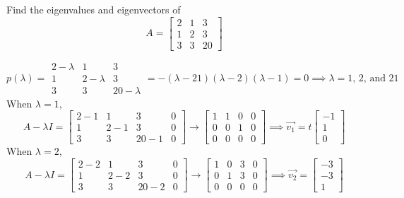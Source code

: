 \begin{example}
	Find the eigenvalues and eigenvectors of
	\begin{equation*}
		A = \begin{bmatrix}
			2 & 1 & 3 \\
			1 & 2 & 3 \\
			3 & 3 & 20
		\end{bmatrix}
	\end{equation*}
\end{example}
\begin{equation*}
	p(\lambda) = \begin{array}{|ccc|}
	2-\lambda & 1 & 3 \\
	1 & 2-\lambda & 3 \\
	3 & 3 & 20-\lambda
	\end{array} = 
	-(\lambda - 21)(\lambda - 2)(\lambda - 1) = 0 \implies \lambda = 1 \text{, } 2 \text{, and } 21
\end{equation*}
When $\lambda = 1$,
\begin{equation*}
	A-\lambda I = \left[
		\begin{array}{ccc|c}
		2-1 & 1 & 3 & 0 \\
		1 & 2-1 & 3 & 0 \\
		3 & 3 & 20-1 & 0
		\end{array} 
	\right] \to \left[
		\begin{array}{ccc|c}
		1 & 1 & 0 & 0 \\
		0 & 0 & 1 & 0 \\
		0 & 0 & 0 & 0
		\end{array}
	\right] \implies \vec{v_{1}} = t \begin{bmatrix}
		-1 \\
		1 \\
		0
	\end{bmatrix}
\end{equation*}
When $\lambda = 2$,
\begin{equation*}
	A-\lambda I = \left[
		\begin{array}{ccc|c}
		2-2 & 1 & 3 & 0 \\
		1 & 2-2 & 3 & 0 \\
		3 & 3 & 20-2 & 0
		\end{array} 
	\right] \to \left[
		\begin{array}{ccc|c}
		1 & 0 & 3 & 0 \\
		0 & 1 & 3 & 0 \\
		0 & 0 & 0 & 0
		\end{array}
	\right] \implies \vec{v_{2}} = \begin{bmatrix}
		-3 \\
		-3 \\
		1
	\end{bmatrix}
\end{equation*}
